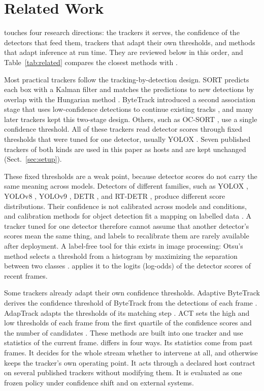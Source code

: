 \section{Related Work}\label{sec:related}

\scl{} touches four research directions: the trackers it serves, the
confidence of the detectors that feed them, trackers that adapt their own
thresholds, and methods that adapt inference at run time. They are reviewed
below in this order, and Table~\ref{tab:related} compares the closest
methods with \scl{}.

Most practical trackers follow the tracking-by-detection design. SORT
predicts each box with a Kalman filter and matches the predictions to new
detections by overlap with the Hungarian method \cite{bewley2016sort}.
ByteTrack introduced a second association stage that uses low-confidence
detections to continue existing tracks \cite{zhang2022bytetrack}, and many
later trackers kept this two-stage design. Others, such as OC-SORT
\cite{cao2023ocsort}, use a single confidence threshold. All of these
trackers read detector scores through fixed thresholds that were tuned for
one detector, usually YOLOX \cite{ge2021yolox}. Seven published trackers of
both kinds are used in this paper as hosts and are kept unchanged
(Sect.~\ref{sec:setup}).

These fixed thresholds are a weak point, because detector scores do not
carry the same meaning across models. Detectors of different families, such
as YOLOX \cite{ge2021yolox}, YOLOv8 \cite{jocher2023yolov8}, YOLOv9
\cite{wang2024yolov9}, DETR \cite{carion2020detr}, and RT-DETR
\cite{zhao2024rtdetr}, produce different score distributions. Their
confidence is not calibrated across models and conditions, and calibration
methods for object detection fit a mapping on labelled data
\cite{kuppers2020detcalib}. A tracker tuned for one detector therefore
cannot assume that another detector's scores mean the same thing, and labels
to recalibrate them are rarely available after deployment. A label-free tool
for this exists in image processing: Otsu's method selects a threshold from
a histogram by maximizing the separation between two classes
\cite{otsu1979}. \scl{} applies it to the logits (log-odds) of the detector
scores of recent frames.

Some trackers already adapt their own confidence thresholds. Adaptive
ByteTrack derives the confidence threshold of ByteTrack from the detections
of each frame \cite{ma2023adaptivebytetrack}. AdapTrack adapts the
thresholds of its matching step \cite{shim2024adaptrack}. ACT sets the high
and low thresholds of each frame from the first quartile of the confidence
scores and the number of candidates \cite{act2026adaptive}. These methods
are built into one tracker and use statistics of the current frame. \scl{}
differs in four ways. Its statistics come from past frames. It decides for
the whole stream whether to intervene at all, and otherwise keeps the
tracker's own operating point. It acts through a declared host contract on
several published trackers without modifying them. It is evaluated as one
frozen policy under confidence shift and on external systems.

